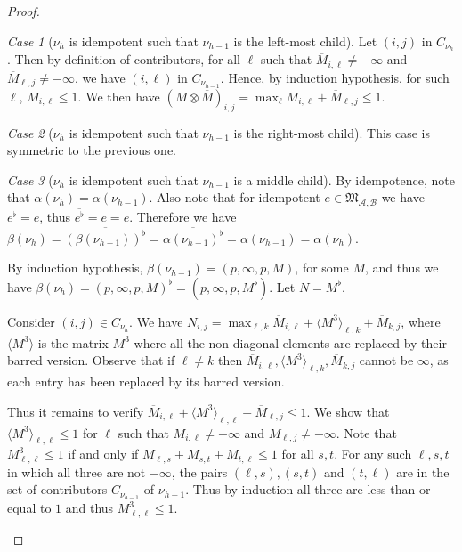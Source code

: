 \documentclass{lmcs}
\theoremstyle{remark}
\newtheorem{case}{Case}
\newcommand{\ideal}{\mathfrak{M}}
\newcommand{\autA}{\mathcal{A}}
\newcommand{\autB}{\mathcal{B}}
\theoremstyle{remark}
\begin{document}
\begin{proof}
\begin{case}[$\nu_h$ is idempotent such that $\nu_{h-1}$ is the left-most child]
Let $(i,j)$ in $C_{\nu_h}$. Then by definition of contributors, for all $\ell$ such that $\overline{M}_{i,\ell} \neq -\infty$ and $\overline{M}_{\ell,j} \neq -\infty$, we have $(i,\ell)$ in $C_{\nu_{h-1}}$.  Hence, by induction hypothesis, for such $\ell$, $M_{i,\ell} \leq 1$. We then have $(M\otimes \overline{M})_{i,j} = \max_{\ell} M_{i,\ell} + \overline{M}_{\ell,j} \leq 1$.
\end{case}

\begin{case}[$\nu_h$ is idempotent such that $\nu_{h-1}$ is the right-most child]
This case is symmetric to the previous one.
\end{case}

\begin{case}[$\nu_h$ is idempotent such that $\nu_{h-1}$ is a middle child]
By idempotence, note that $\alpha(\nu_h) = \alpha(\nu_{h-1})$. Also note that for idempotent $e\in \overline{\ideal}_{\autA,\autB}$ we have $e^\flat = e$, thus $\overline{e^\flat} = \overline{e} = e$. Therefore we have $\overline{\beta(\nu_{h})} = \overline{(\beta(\nu_{h-1}))^\flat} = \overline{\alpha(\nu_{h-1})^\flat} = \alpha(\nu_{h-1}) =  \alpha(\nu_h)$.

By induction hypothesis, $\beta(\nu_{h-1}) = (p,\infty,p,M)$,  for some $M$, and thus we have $\beta(\nu_{h})= (p,\infty,p,M)^\flat  = (p,\infty,p,M^\flat)$. Let $N = M^\flat$.

Consider $(i,j)\in C_{\nu_h}$.
We have $N_{i,j} = \max_{\ell,k} \overline{M}_{i,\ell} + \langle M^3 \rangle_{\ell,k} + \overline{M}_{k,j}$, where $\langle M^3 \rangle$ is the matrix $M^3$ where all the non diagonal elements are replaced by their barred version.
Observe that if $\ell \ne k$ then $\overline{M}_{i,\ell},\langle M^3 \rangle_{\ell,k}, \overline{M}_{k,j}$ cannot be $\infty$, as each entry has been replaced by its barred version. 

Thus it remains to verify $\overline{M}_{i,\ell} + \langle M^3 \rangle_{\ell,\ell} + \overline{M}_{\ell,j} \le 1$. We show that $\langle M^3 \rangle_{\ell,\ell}\le 1$ for $\ell$ such that $M_{i,\ell} \ne -\infty$ and $M_{\ell,j} \ne-\infty$. Note that $M^3_{\ell,\ell} \le 1$ if and only if $M_{\ell,s} + M_{s,t} + M_{t,\ell}\le 1$ for all $s,t$. For any such $\ell,s,t$ in which all three are not $-\infty$, the pairs $(\ell,s),(s,t)$ and $(t,\ell)$ are in the set of contributors $C_{\nu_{h-1}}$ of $\nu_{h-1}$. Thus by induction all three are less than or equal to $1$ and thus $M^3_{\ell,\ell} \le 1$.
\qedhere
\end{case}
\end{proof}
\end{document}

